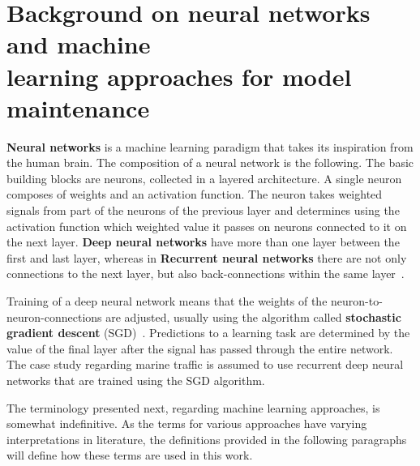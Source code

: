 \section[Background on neural networks and machine learning approaches for model maintenance]{Background on neural networks and machine\\ learning approaches for model maintenance}

\textbf{Neural networks} is a machine learning paradigm that takes its inspiration from the human brain. The composition of a neural network is the following. The basic building blocks are neurons, collected in a layered architecture. A single neuron composes of weights and an activation function. The neuron takes weighted signals from part of the neurons of the previous layer and determines using the activation function which weighted value it passes on neurons connected to it on the next layer. \textbf{Deep neural networks}  have more than one layer between the first and last layer, whereas in \textbf{Recurrent neural networks} there are not only connections to the next layer, but also back-connections within the same layer~\cite{ben-nunDemystifyingParallelDistributed2019}. 

 Training of a deep neural network means that the weights of the neuron-to-neuron-connections are adjusted, usually using the algorithm called \textbf{stochastic gradient descent} (SGD)~\cite{ben-nunDemystifyingParallelDistributed2019}. Predictions to a learning task are determined by the value of the final layer after the signal has passed through the entire network. The case study regarding marine traffic is assumed to use recurrent deep neural networks that are trained using the SGD algorithm.

The terminology presented next, regarding machine learning approaches, is somewhat indefinitive. As the terms for various approaches have varying interpretations in literature, the definitions provided in the following paragraphs will define how these terms are used in this work.

